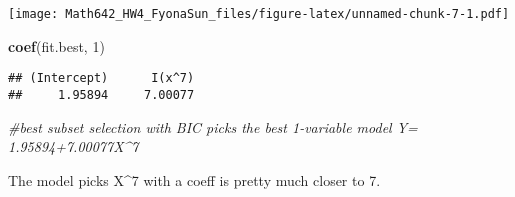 \documentclass[]{article}
\newenvironment{Shaded}{\begin{snugshade}}{\end{snugshade}}
\newcommand{\KeywordTok}[1]{\textcolor[rgb]{0.13,0.29,0.53}{\textbf{{#1}}}}
\newcommand{\DataTypeTok}[1]{\textcolor[rgb]{0.13,0.29,0.53}{{#1}}}
\newcommand{\DecValTok}[1]{\textcolor[rgb]{0.00,0.00,0.81}{{#1}}}
\newcommand{\StringTok}[1]{\textcolor[rgb]{0.31,0.60,0.02}{{#1}}}
\newcommand{\CommentTok}[1]{\textcolor[rgb]{0.56,0.35,0.01}{\textit{{#1}}}}
\newcommand{\NormalTok}[1]{{#1}}
\begin{document}
\begin{Shaded}
\end{Shaded}

\texttt{[image: Math642\_HW4\_FyonaSun\_files/figure-latex/unnamed-chunk-7-1.pdf]}

\begin{Shaded}
\begin{Highlighting}[]
\KeywordTok{coef}\NormalTok{(fit.best, }\DecValTok{1}\NormalTok{)}
\end{Highlighting}
\end{Shaded}

\begin{verbatim}
## (Intercept)      I(x^7) 
##     1.95894     7.00077
\end{verbatim}

\begin{Shaded}
\begin{Highlighting}[]
\CommentTok{#best subset selection with BIC picks the best 1-variable model Y= 1.95894+7.00077X^7}
\end{Highlighting}
\end{Shaded}

The model picks X\^{}7 with a coeff is pretty much closer to 7.
\end{document}

